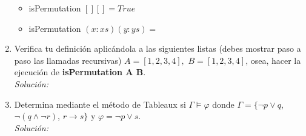 \documentclass[letterpaper,11pt]{article}
\begin{document}
\begin{enumerate}
    \begin{itemize}
        \item isPermutation $[] [] = True$
        \item isPermutation $(x:xs) (y:ys) = $
    \end{itemize}

    \item Verifica tu definición aplicándola a las siguientes listas (debes
    mostrar paso a paso las llamadas recursivas) $A = [1,2,3,4],$ 
    $B = [1,2,3,4]$, osea, hacer la ejecución de \textbf{isPermutation A B}.\\
    \textit{Solución:}
    
    \item Determina mediante el método de Tableaux si $\Gamma \models \varphi$
    donde $\Gamma = \{ \neg p \lor q$, $\neg (q \land \neg r)$, 
    $r \rightarrow s \}$ y $\varphi = \neg p \lor s$.\\
    \textit{Solución:}

\end{enumerate}
    
\end{document}
